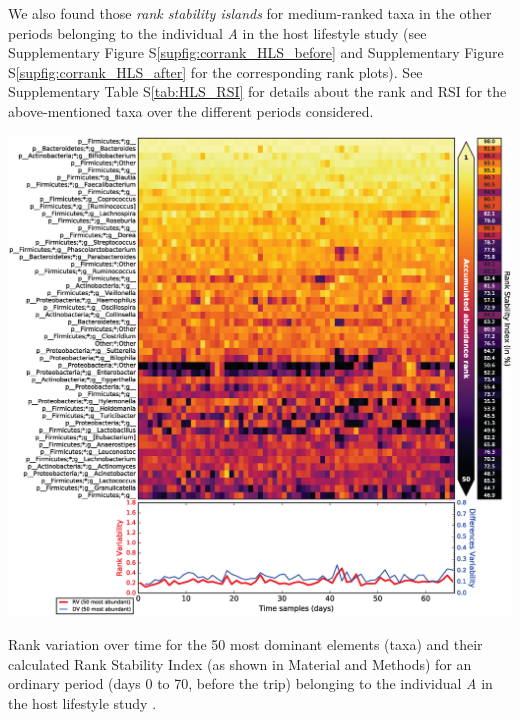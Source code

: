 We also found those \emph{rank stability islands} for medium-ranked taxa in the other periods belonging to the individual \emph{A} in the host lifestyle study \cite{hostlife} (see Supplementary Figure S\ref{supfig:corrank_HLS_before} and Supplementary Figure S\ref{supfig:corrank_HLS_after} for the corresponding rank plots). See Supplementary Table S\ref{tab:HLS_RSI} for details about the rank and RSI for the above-mentioned taxa over the different periods considered.

\begin{supfig}
	\centering
	\includegraphics[width=1.0\textwidth]{figs/supfig_corrank_HLS_StoolA_before.eps}
	\caption{Rank variation over time for the 50 most dominant elements (taxa) and their calculated Rank Stability Index (as shown in Material and Methods) for an ordinary period (days 0 to 70, before the trip) belonging to the individual \emph{A} in the host lifestyle study \cite{hostlife}.}
	\label{supfig:corrank_HLS_before}
\end{supfig}

